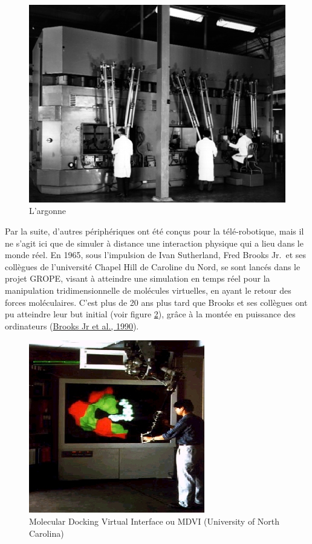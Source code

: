 \documentclass[
]{book}
\begin{document}
\begin{figure}
\centering
\includegraphics{img/argonne.png}
\caption{\label{fig:argonne}L'argonne}
\end{figure}

Par la suite, d'autres périphériques ont été conçus pour la
télé-robotique, mais il ne s'agit ici que de simuler à distance une
interaction physique qui a lieu dans le monde réel. En 1965,
sous l'impulsion de Ivan Sutherland, Fred Brooks Jr.~et ses collègues de
l'université Chapel Hill de Caroline du Nord, se sont lancés dans le projet
GROPE, visant à atteindre une simulation en temps réel pour la manipulation
tridimensionnelle de molécules virtuelles, en ayant le retour des forces
moléculaires. C'est plus de 20 ans plus tard que Brooks et ses collègues ont
pu atteindre leur but initial (voir figure \ref{fig:MDVI}), grâce à la montée
en puissance des ordinateurs (\protect\hyperlink{ref-brooks1990project}{Brooks Jr et al., 1990}).

\begin{figure}
\centering
\includegraphics{img/molecular.png}
\caption{\label{fig:MDVI}Molecular Docking Virtual Interface ou MDVI (University of North
Carolina)}
\end{figure}
\end{document}
